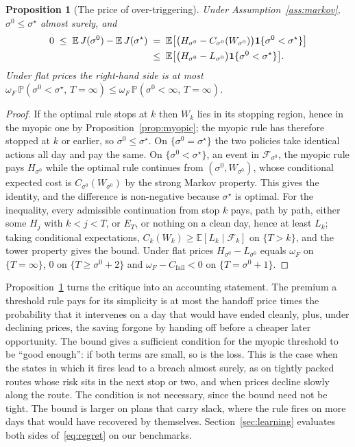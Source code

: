 \documentclass[preprint,authoryear,12pt]{elsarticle}
\newtheorem{proposition}[theorem]{Proposition}
\theoremstyle{definition}
\theoremstyle{remark}
\begin{document}
\begin{proposition}[The price of over-triggering]\label{prop:regret}
Under Assumption~\ref{ass:markov}, $\sigma^0 \le \sigma^\star$ almost
surely, and
\begin{align}
  0 \;\le\; \mathbb E\,J(\sigma^0) - \mathbb E\,J(\sigma^\star)
  &\;=\; \mathbb E\bigl[\bigl(H_{\sigma^0} - C_{\sigma^0}(W_{\sigma^0})\bigr)
        \mathbf 1\{\sigma^0 < \sigma^\star\}\bigr] \notag\\
  &\;\le\; \mathbb E\bigl[\bigl(H_{\sigma^0} - L_{\sigma^0}\bigr)
        \mathbf 1\{\sigma^0 < \sigma^\star\}\bigr]. \label{eq:regret}
\end{align}
Under flat prices the right-hand side is at most
$\omega_F\,\mathbb P(\sigma^0 < \sigma^\star,\, T = \infty) \le
\omega_F\,\mathbb P(\sigma^0 < \infty,\, T = \infty)$.
\end{proposition}

\begin{proof}
If the optimal rule stops at $k$ then $W_k$ lies in its stopping region,
hence in the myopic one by Proposition~\ref{prop:myopic}; the myopic rule
has therefore stopped at $k$ or earlier, so $\sigma^0 \le \sigma^\star$.
On $\{\sigma^0 = \sigma^\star\}$ the two policies take identical actions
all day and pay the same. On $\{\sigma^0 < \sigma^\star\}$, an event in
$\mathcal F_{\sigma^0}$, the myopic rule pays $H_{\sigma^0}$ while the
optimal rule continues from $(\sigma^0, W_{\sigma^0})$, whose conditional
expected cost is $C_{\sigma^0}(W_{\sigma^0})$ by the strong Markov
property. This gives the identity, and the difference is non-negative
because $\sigma^\star$ is optimal. For the inequality, every admissible
continuation from stop $k$ pays, path by path, either some $H_j$ with
$k < j < T$, or $E_T$, or nothing on a clean day, hence at least $L_k$;
taking conditional expectations, $C_k(W_k) \ge \mathbb E[L_k \mid
\mathcal F_k]$ on $\{T > k\}$, and the tower property gives the bound.
Under flat prices $H_{\sigma^0} - L_{\sigma^0}$ equals $\omega_F$ on
$\{T = \infty\}$, $0$ on $\{T \ge \sigma^0 + 2\}$ and
$\omega_F - C_{\mathrm{fail}} < 0$ on $\{T = \sigma^0 + 1\}$.
\end{proof}

Proposition~\ref{prop:regret} turns the critique into an accounting
statement. The premium a threshold rule pays for its simplicity is at
most the handoff price times the probability that it intervenes on a
day that would have ended cleanly, plus, under declining prices, the
saving forgone by handing off before a cheaper later opportunity. The
bound gives a sufficient condition for the myopic threshold to be
``good enough'': if both terms are small, so is the loss. This is the
case when the states in which it fires lead to a breach almost surely,
as on tightly packed routes whose risk sits in the next stop or two, and
when prices decline slowly along the route. The condition is not
necessary, since the bound need not be tight. The bound is larger on
plans that carry slack, where the rule fires on more days that would
have recovered by themselves. Section~\ref{sec:learning} evaluates both sides
of~\eqref{eq:regret} on our benchmarks.
\end{document}
